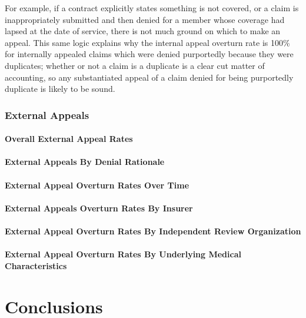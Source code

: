 \documentclass[12pt, a4paper,twoside]{report}
\theoremstyle{plain} %
\theoremstyle{definition} %
\theoremstyle{remark} %
\numberwithin{equation}{chapter}
\begin{document}
		
		For example, if a contract explicitly states something is not covered, or a claim is inappropriately submitted and then denied for a member whose coverage had lapsed at the date of service, there is not much ground on which to make an appeal. This same logic explains why the internal appeal overturn rate is 100\% for internally appealed claims which were denied purportedly because they were duplicates; whether or not a claim is a duplicate is a clear cut matter of accounting, so any substantiated appeal of a claim denied for being purportedly duplicate is likely to be sound.
		
		\subsection{External Appeals}\label{publicdata:externalappeals}
		
		\subsubsection{Overall External Appeal Rates}
		
		\subsubsection{External Appeals By Denial Rationale}
		
		\subsubsection{External Appeal Overturn Rates Over Time}
		
		\subsubsection{External Appeals Overturn Rates By Insurer}
		
		\subsubsection{External Appeal Overturn Rates By Independent Review Organization}
		
		\subsubsection{External Appeal Overturn Rates By Underlying Medical Characteristics}
		
		\chapter{Conclusions}\label{conclusions}
		
\end{document}

